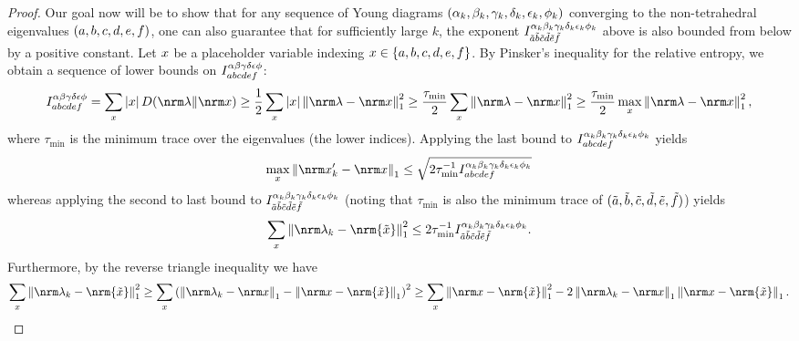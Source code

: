 \documentclass[notitlepage, 10pt]{article}
\begin{document}
\begin{proof}
    Our goal now will be to show that for any sequence of Young diagrams $(\alpha_k, \beta_k, \gamma_k, \delta_k, \epsilon_k, \phi_k)$ converging to the non-tetrahedral eigenvalues $(a,b,c,d,e,f)$, one can also guarantee that for sufficiently large $k$, the exponent $I_{\tilde {a}\tilde {b}\tilde {c}\tilde {d}\tilde {e}\tilde {f}}^{\alpha_k\beta_k\gamma_k\delta_k\epsilon_k\phi_k}$ above is also bounded from below by a positive constant.
    Let $x$ be a placeholder variable indexing $x \in \{a,b,c,d,e,f\}$.
    By Pinsker's inequality for the relative entropy, we obtain a sequence of lower bounds on $I^{\alpha\beta\gamma\delta\epsilon\phi}_{abcdef}$:
    \begin{align}
        I^{\ya\yb\yc\yd\ye\yf}_{\ea\eb\ec\ed\ee\ef}
        = \sum_{\ex} \abs{\ex} \kl{\nrm \yx}{\nrm \ex}
        \geq \frac{1}{2}\sum_{\ex} \abs{\ex} \norm{\nrm \yx - \nrm \ex}_{1}^{2}
        \geq \frac{\tau_{\min}}{2} \sum_{\ex} \norm{\nrm \yx - \nrm \ex}_{1}^{2}
        \geq \frac{\tau_{\min}}{2} \max_{\ex} \norm{\nrm \yx - \nrm \ex}_{1}^{2},
    \end{align}
    where $\tau_{\min}$ is the minimum trace over the eigenvalues (the lower indices).
    Applying the last bound to $I_{abcdef}^{\alpha_k\beta_k\gamma_k\delta_k\epsilon_k\phi_k}$ yields
    \begin{equation}
        \max_{\ex}\norm{\nrm \ex_k' - \nrm \ex}_{1} \leq \sqrt{2 \tau_{\min}^{-1} I_{\ea\eb\ec\ed\ee\ef}^{\ya_k\yb_k\yc_k\yd_k\ye_k\yf_k}}
    \end{equation}
    whereas applying the second to last bound to $I_{\tilde {a}\tilde {b} \tilde {c}\tilde {d}\tilde {e}\tilde {f}}^{\alpha_k\beta_k\gamma_k\delta_k\epsilon_k\phi_k}$ (noting that $\tau_{\min}$ is also the minimum trace of $(\tilde {a},\tilde {b}, \tilde {c}, \tilde {d}, \tilde {e}, \tilde {f})$) yields
    \begin{equation}
        \sum_{\ex} \norm{\nrm \yx_k - \nrm {\tilde \ex}}_{1}^2 \leq 2 \tau_{\min}^{-1}I^{\ya_k\yb_k\yc_k\yd_k\ye_k\yf_k}_{\tilde \ea \tilde \eb\tilde \ec\tilde \ed\tilde \ee\tilde \ef}.
    \end{equation}
    Furthermore, by the reverse triangle inequality we have
    \begin{align}
        \sum_{\ex} \norm{\nrm \yx_k - \nrm {\tilde \ex}}_{1}^2
        \geq
        \sum_{\ex}\left(\norm{\nrm \yx_k - \nrm \ex}_{1}
        -\norm{\nrm \ex - \nrm {\tilde \ex}}_{1}\right)^2
        \geq
        \sum_{\ex}\norm{\nrm \ex - \nrm {\tilde \ex}}_{1}^2 -2\norm{\nrm \yx_k - \nrm \ex}_{1}\norm{\nrm \ex - \nrm {\tilde \ex}}_{1}.

\end{align}
\end{proof}
\end{document}
